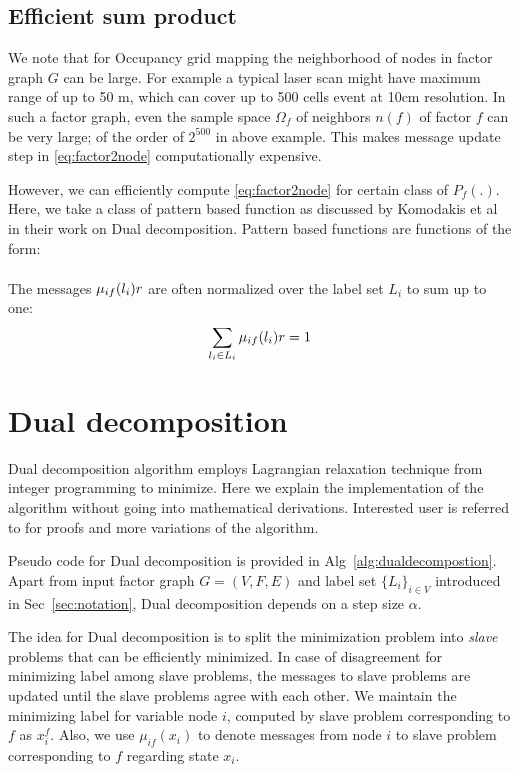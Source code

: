 \documentclass[letterpaper, 10 pt, conference]{ieeeconf} %
\begin{document}
\subsection{Efficient sum product}
We note that for Occupancy grid mapping the neighborhood of nodes in factor
graph $G$ can be large. For example a typical laser scan might have maximum
range of up to 50 m, which can cover up to 500 cells event at 10cm resolution.
In such a factor graph, even the sample space $\Omega_f$ of neighbors
$n(f)$ of factor $f$ can be very large; of the order of $2^{500}$  in above
example. This makes message update step in \eqref{eq:factor2node}
computationally expensive.

However, we can efficiently compute \eqref{eq:factor2node} for certain class of
$P_f(.)$. Here, we take a class of pattern based function as discussed by
Komodakis et al \cite{komodakis2009beyond} in their work on Dual decomposition. Pattern based functions are functions of the form:
\begin{align}
\end{align}

The messages $\msg{i}{f}{l_i}{r}$ are often normalized over the label set $L_i$ to sum up to one:
\begin{align}
  \sum_{l_i \in L_i} \msg{i}{f}{l_i}{r} = 1
\end{align}

\section{Dual decomposition}
\renewcommand{\msg}[3]{\mu_{#1#2}(#3)}
\newcommand{\assign}{\leftarrow}
\newcommand{\Sx}{L_i}
Dual decomposition algorithm employs Lagrangian relaxation technique from integer programming to minimize. Here we explain the implementation of the algorithm without going into mathematical derivations. Interested user is referred to \cite{sontag2011introduction,jojic2010accelerated,komodakis2009beyond} for proofs and more variations of the algorithm. 

Pseudo code for Dual decomposition is provided in Alg~\ref{alg:dualdecompostion}. Apart from input factor graph $G = (V, F, E)$ and label set $\{\Sx\}_{i \in V}$ introduced in Sec~\ref{sec:notation}, Dual decomposition depends on a step size $\alpha$.

The idea for Dual decomposition is to split the minimization problem into \emph{slave} problems that can be efficiently minimized. In case of disagreement for minimizing label among slave problems, the messages to slave problems are updated until the slave problems agree with each other. We maintain the minimizing label for variable node $i$, computed by slave problem corresponding to $f$ as $x^f_i$. Also, we use $\msg{i}{f}{x_i}$ to denote messages from node $i$ to slave problem corresponding to $f$ regarding state $x_i$.
\end{document}
